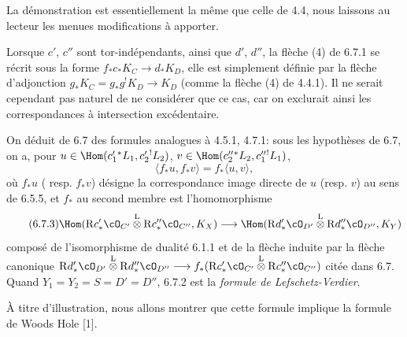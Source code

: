 La démonstration est essentiellement la même que celle de 4.4, nous laissons au lecteur les menues modifications à apporter.

Lorsque $c'$, $c''$ sont tor-indépendants, ainsi que $d'$, $d''$, la flèche (4) de 6.7.1 se récrit sous la forme $f_*c_*K_C\to d_*K_D$, elle est simplement définie par la flèche d'adjonction $g_*K_C=g_*g^!K_D\to K_D$ (comme la flèche (4) de 4.4.1). Il ne serait cependant pas naturel de ne considérer que ce cas, car on exclurait ainsi les correspondances à intersection excédentaire.

On déduit de 6.7 des formules analogues à 4.5.1, 4.7.1: sous les hypothèses de 6.7, on a, pour $u\in\Hom(c_1'{}^*L_1,c_2'{}^!L_2)$, $v\in\Hom(c_2''{}^*L_2,c_1''{}^!L_1)$,
\begin{equation}
\tag{6.7.2}
\langle f_*u,f_*v\rangle=f_*\langle u,v\rangle,
\end{equation}
où $f_*u$ (
resp. $f_*v$) désigne la correspondance image directe de $u$ (resp. $v$) au sens de 6.5.5, et $f_*$ au second membre est l'homomorphisme
\begin{equation}
\tag{6.7.3}
\Hom(\mathrm{R} c'_*\cO_{C'}\overset{\mathrm{L}}{\otimes}\mathrm{R} c''_*\cO_{C''},K_X)
\longrightarrow
\Hom(\mathrm{R} d'_*\cO_{D'}\overset{\mathrm{L}}{\otimes}\mathrm{R} d''_*\cO_{D''},K_Y)
\end{equation}
composé de l'isomorphisme de dualité 6.1.1 et de la flèche induite par la flèche canonique $\mathrm{R} d'_*\cO_{D'}\overset{\mathrm{L}}{\otimes}\mathrm{R} d''_*\cO_{D''}\longrightarrow f_*(\mathrm{R} c'_*\cO_{C'}\overset{\mathrm{L}}{\otimes}\mathrm{R} c''_*\cO_{C''})$ citée dans 6.7. Quand $Y_1=Y_2=S=D'=D''$, 6.7.2 est la \emph{formule de Lefschetz-Verdier}.

À titre d'illustration, nous allons montrer que cette formule implique la formule de Woods Hole [1].


